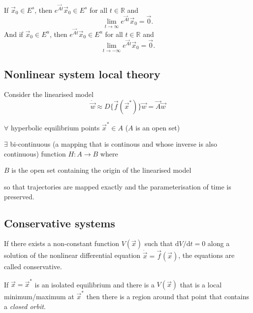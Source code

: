\begin{theorem}
	If $\vec x_0 \in E^s$, then $e^{\vec At}\vec x_0 \in E^s$ for all $t \in \mathbb R$ and
	\begin{equation*}
		\lim_{t \to \infty} e^{\vec At} \vec x_0 = \vec 0.
	\end{equation*}
	And if $\vec x_0 \in E^u$, then $e^{\vec At}\vec x_0 \in E^u$ for all $t \in \mathbb R$ and
	\begin{equation*}
		\lim_{t \to -\infty} e^{\vec At} \vec x_0 = \vec 0.
	\end{equation*}
\end{theorem}

\subsection{Nonlinear system local theory}
Consider the linearised model
\begin{equation*}
	\dot{\vec w} \approx D\{\vec f(\vec x^\ast)\} \vec w = \vec A \vec w
\end{equation*}

\begin{theorem}
	$\forall$ hyperbolic equilibrium points $\vec x^\ast \in A$ ($A$ is an open set)

	$\exists$ bi-continuous (a mapping that is continous and whose inverse is also continuous) function $H: A \to B$ where

	$B$ is the open set containing the origin of the linearised model

	so that trajectories are mapped exactly and the parameterisation of time is preserved.
\end{theorem}

\subsection{Conservative systems}
If there exists a non-constant function $V(\vec x)$ such that $\mathrm dV / \mathrm dt = 0$ along a solution of the nonlinear differential equation $\dot{\vec x} = \vec f(\vec x)$, the equations are called conservative.

If $\vec x = \vec x^\ast$ is an isolated equilibrium and there is a $V(\vec x)$ that is a local minimum/maximum at $\vec x^\ast$ then there is a region around that point that contains a \emph{closed orbit}.